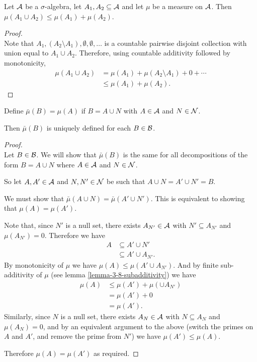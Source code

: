 \begin{lemma}\label{lemma-3-8-subadditivity}
  Let $\mathcal A$ be a $\sigma$-algebra, let $A_1, A_2 \subseteq \mathcal A$ and let $\mu$ be a measure on $\mathcal A$.
  Then $\mu(A_1 \cup A_2) \leq \mu(A_1) + \mu(A_2)$.
\end{lemma}

\begin{proof}~\\
  Note that $A_1, (A_2 \setminus A_1), \emptyset, \emptyset, \ldots$ is a countable pairwise disjoint
  collection with union equal to $A_1 \cup A_2$. Therefore, using countable additivity followed by
  monotonicity,
  \begin{align*}
    \mu(A_1 \cup A_2)
    &= \mu(A_1) + \mu(A_2 \setminus A_1) + 0 + \cdots \\
    &\leq \mu(A_1) + \mu(A_2).
  \end{align*}
\end{proof}

\begin{claim*}
  Define $\bar{\mu}(B) = \mu(A)$ if $B = A \cup N$ with $A \in \mathcal A$ and $N \in \mathcal N$.

  Then $\bar{\mu}(B)$ is uniquely defined for each $B \in \mathcal B$.
\end{claim*}

\begin{proof}~\\
  Let $B \in \mathcal B$. We will show that $\bar\mu(B)$ is the same for all decompositions of the
  form $B = A \cup N$ where $A \in \mathcal A$ and $N \in \mathcal N$.

  So let $A, A' \in \mathcal A$ and $N, N' \in \mathcal N$ be such that $A \cup N = A' \cup N' = B$.

  We must show that $\bar{\mu}(A \cup N) = \bar{\mu}(A' \cup N')$. This is equivalent to showing
  that $\mu(A) = \mu(A')$.

  Note that, since $N'$ is a null set, there exists $A_{N'} \in \mathcal A$ with $N' \subseteq A_{N'}$
  and $\mu(A_{N'}) = 0$. Therefore we have
  \begin{align*}
    A
    &\subseteq A' \cup N' \\
    &\subseteq A' \cup A_{N'}.
  \end{align*}
  By monotonicity of $\mu$ we have $\mu(A) \leq \mu(A' \cup A_{N'})$. And by finite sub-additivity of $\mu$
  (see lemma \eqref{lemma-3-8-subadditivity}) we have
  \begin{align*}
    \mu(A)
    &\leq \mu(A') + \mu(\cup A_{N'}) \\
    &= \mu(A') + 0 \\
    &= \mu(A').
  \end{align*}
  Similarly, since $N$ is a null set, there exists $A_{N} \in \mathcal A$ with $N \subseteq A_{N}$
  and $\mu(A_{N}) = 0$, and by an equivalent argument to the above (switch the primes on $A$ and $A'$, and
  remove the prime from $N'$) we have $\mu(A') \leq \mu(A)$.

  Therefore $\mu(A) = \mu(A')$ as required.
\end{proof}

